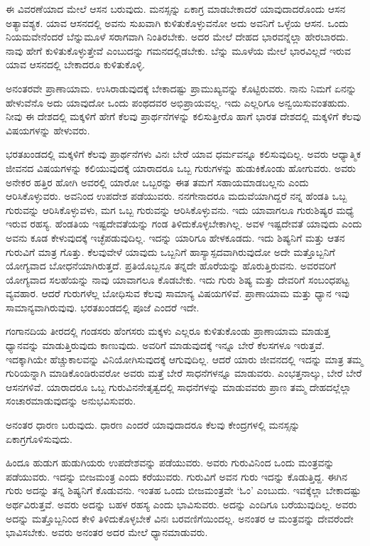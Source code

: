 ಈ ವಿವರಣೆಯಾದ ಮೇಲೆ ಆಸನ ಬರುವುದು. ಮನಸ್ಸನ್ನು ಏಕಾಗ್ರ ಮಾಡಬೇಕಾದರೆ ಯಾವುದಾದರೊಂದು ಆಸನ ಅತ್ಯಾವಶ್ಯಕ. ಯಾವ ಆಸನದಲ್ಲಿ ಅವನು ಸುಖವಾಗಿ ಕುಳಿತುಕೊಳ್ಳುವನೋ ಅದು ಅವನಿಗೆ ಒಳ್ಳೆಯ ಆಸನ. ಒಂದು ನಿಯಮವೇನೆಂದರೆ ಬೆನ್ನುಮೂಳೆ ಸರಾಗವಾಗಿ ನಿಂತಿರಬೇಕು. ಅದರ ಮೇಲೆ ದೇಹದ ಭಾರವನ್ನೆಲ್ಲಾ ಹೇರಬಾರದು. ನಾವು ಹೇಗೆ ಕುಳಿತುಕೊಳ್ಳುತ್ತೇವೆ ಎಂಬುದನ್ನು ಗಮನದಲ್ಲಿಡಬೇಕು. ಬೆನ್ನು ಮೂಳೆಯ ಮೇಲೆ ಭಾರವಿಲ್ಲದೆ ಇರುವ ಯಾವ ಆಸನದಲ್ಲಿ ಬೇಕಾದರೂ ಕುಳಿತುಕೊಳ್ಳಿ.

ಅನಂತರವೇ ಪ್ರಾಣಾಯಾಮ. ಉಸಿರಾಡುವುದಕ್ಕೆ ಬೇಕಾದಷ್ಟು ಪ್ರಾಮುಖ್ಯವನ್ನು ಕೊಟ್ಟಿರುವರು. ನಾನು ನಿಮಗೆ ಏನನ್ನು ಹೇಳುವೆನೊ ಅದು ಯಾವುದೋ ಒಂದು ಪಂಥದವರ ಅಭಿಪ್ರಾಯವಲ್ಲ. ಇದು ಎಲ್ಲರಿಗೂ ಅನ್ವಯಿಸುವಂತಹುದು. ನೀವು ಈ ದೇಶದಲ್ಲಿ ಮಕ್ಕಳಿಗೆ ಹೇಗೆ ಕೆಲವು ಪ್ರಾರ್ಥನೆಗಳನ್ನು ಕಲಿಸುತ್ತೀರೊ ಹಾಗೆ ಭಾರತ ದೇಶದಲ್ಲಿ ಮಕ್ಕಳಿಗೆ ಕೆಲವು ವಿಷಯಗಳನ್ನು ಹೇಳುವರು.

ಭರತಖಂಡದಲ್ಲಿ ಮಕ್ಕಳಿಗೆ ಕೆಲವು ಪ್ರಾರ್ಥನೆಗಳು ವಿನಃ ಬೇರೆ ಯಾವ ಧರ್ಮವನ್ನೂ ಕಲಿಸುವುದಿಲ್ಲ. ಅವರು ಆಧ್ಯಾತ್ಮಿಕ ಜೀವನದ ವಿಷಯಗಳನ್ನು ಕಲಿಯುವುದಕ್ಕೆ ಯಾರಾದರೂ ಒಬ್ಬ ಗುರುಗಳನ್ನು ಹುಡುಕಿಕೊಂಡು ಹೋಗುವರು. ಅವರು ಅನೇಕರ ಹತ್ತಿರ ಹೋಗಿ ಅವರಲ್ಲಿ ಯಾರೋ ಒಬ್ಬರನ್ನು ಈತ ತಮಗೆ ಸಹಾಯಮಾಡಬಲ್ಲನು ಎಂದು ಆರಿಸಿಕೊಳ್ಳುವರು. ಅವನಿಂದ ಉಪದೇಶ ಪಡೆಯುವರು. ನನಗೇನಾದರೂ ಮದುವೆಯಾಗಿದ್ದರೆ ನನ್ನ ಹೆಂಡತಿ ಒಬ್ಬ ಗುರುವನ್ನು ಆರಿಸಿಕೊಳ್ಳುವಳು, ಮಗ ಒಬ್ಬ ಗುರುವನ್ನು ಆರಿಸಿಕೊಳ್ಳುವನು. ಇದು ಯಾವಾಗಲೂ ಗುರುಶಿಷ್ಯರ ಮಧ್ಯೆ ಇರುವ ರಹಸ್ಯ. ಹೆಂಡತಿಯ ಇಷ್ಟದೇವತೆಯನ್ನು ಗಂಡ ತಿಳಿದುಕೊಳ್ಳಬೇಕಾಗಿಲ್ಲ. ಅವಳ ಇಷ್ಟದೇವತೆ ಯಾವುದು ಎಂದು ಅವನು ಕೂಡ ಕೇಳುವುದಕ್ಕೆ ಇಚ್ಛೆಪಡುವುದಿಲ್ಲ. ಇದನ್ನು ಯಾರಿಗೂ ಹೇಳಕೂಡದು. ಇದು ಶಿಷ್ಯನಿಗೆ ಮತ್ತು ಆತನ ಗುರುವಿಗೆ ಮಾತ್ರ ಗೊತ್ತು. ಕೆಲವುವೇಳೆ ಯಾವುದು ಒಬ್ಬನಿಗೆ ಹಾಸ್ಯಾಸ್ಪದವಾಗಿರುವುದೋ ಅದೇ ಮತ್ತೊಬ್ಬನಿಗೆ ಯೋಗ್ಯವಾದ ಬೋಧನೆಯಾಗಿರುತ್ತದೆ. ಪ್ರತಿಯೊಬ್ಬನೂ ತನ್ನದೇ ಹೊರೆಯನ್ನು ಹೊರುತ್ತಿರುವನು. ಅವರವರಿಗೆ ಯೋಗ್ಯವಾದ ಸಲಹೆಯನ್ನು ನಾವು ಯಾವಾಗಲೂ ಕೊಡಬೇಕು. ಇದು ಗುರು ಶಿಷ್ಯ ಮತ್ತು ದೇವರಿಗೆ ಸಂಬಂಧಪಟ್ಟ ವ್ಯವಹಾರ. ಆದರೆ ಗುರುಗಳೆಲ್ಲ ಬೋಧಿಸುವ ಕೆಲವು ಸಾಮಾನ್ಯ ವಿಷಯಗಳಿವೆ. ಪ್ರಾಣಾಯಾಮ ಮತ್ತು ಧ್ಯಾನ ಇವು ಸಾಮಾನ್ಯವಾಗಿರುವುವು. ಭರತಖಂಡದಲ್ಲಿ ಪೂಜೆ ಎಂದರೆ ಇದೇ.

ಗಂಗಾನದಿಯ ತೀರದಲ್ಲಿ ಗಂಡಸರು ಹೆಂಗಸರು ಮಕ್ಕಳು ಎಲ್ಲರೂ ಕುಳಿತುಕೊಂಡು ಪ್ರಾಣಾಯಾಮ ಮಾಡುತ್ತ ಧ್ಯಾನವನ್ನು ಮಾಡುತ್ತಿರುವುದು ಕಾಣುವುದು. ಅವರಿಗೆ ಮಾಡುವುದಕ್ಕೆ ಇನ್ನೂ ಬೇರೆ ಕೆಲಸಗಳೂ ಇರುತ್ತವೆ. ಇದಕ್ಕಾಗಿಯೇ ಹೆಚ್ಚುಕಾಲವನ್ನು ವಿನಿಯೋಗಿಸುವುದಕ್ಕೆ ಆಗುವುದಿಲ್ಲ. ಆದರೆ ಯಾರು ಜೀವನದಲ್ಲಿ ಇದನ್ನು ಮಾತ್ರ ತಮ್ಮ ಗುರಿಯನ್ನಾಗಿ ಮಾಡಿಕೊಂಡಿರುವರೋ ಅವರು ಮತ್ತೆ ಬೇರೆ ಸಾಧನೆಗಳನ್ನೂ ಮಾಡುವರು. ಎಂಭತ್ತನಾಲ್ಕು, ಬೇರೆ ಬೇರೆ ಆಸನಗಳಿವೆ. ಯಾರಾದರೂ ಒಬ್ಬ ಗುರುವಿನ\break ನೇತೃತ್ವದಲ್ಲಿ ಸಾಧನೆಗಳನ್ನು ಮಾಡುವವರು ಪ್ರಾಣ ತಮ್ಮ ದೇಹದಲ್ಲೆಲ್ಲಾ ಸಂಚಾರಮಾಡುವುದನ್ನು ಅನುಭವಿಸುವರು.

ಅನಂತರ ಧಾರಣ ಬರುವುದು. ಧಾರಣ ಎಂದರೆ ಯಾವುದಾದರೂ ಕೆಲವು ಕೇಂದ್ರಗಳಲ್ಲಿ ಮನಸ್ಸನ್ನು ಏಕಾಗ್ರಗೊಳಿಸುವುದು.

ಹಿಂದೂ ಹುಡುಗ ಹುಡುಗಿಯರು ಉಪದೇಶವನ್ನು ಪಡೆಯುವರು. ಅವರು ಗುರುವಿನಿಂದ ಒಂದು ಮಂತ್ರವನ್ನು ಪಡೆಯುವರು. ಇದನ್ನು ಬೀಜಮಂತ್ರ ಎಂದು ಕರೆಯುವರು. ಗುರುವಿಗೆ ಅವನ ಗುರು ಇದನ್ನು ಕೊಡುತ್ತಿದ್ದ. ಈಗಿನ ಗುರು ಅದನ್ನು ತನ್ನ ಶಿಷ್ಯನಿಗೆ ಕೊಡುವನು. ಇಂತಹ ಒಂದು ಬೀಜಮಂತ್ರವೇ `ಓಂ' ಎಂಬುದು. ಇವಕ್ಕೆಲ್ಲಾ ಬೇಕಾದಷ್ಟು ಅರ್ಥವಿರುತ್ತವೆ. ಅವರು ಅದನ್ನು ಬಹಳ ರಹಸ್ಯ ಎಂದು ಭಾವಿಸುವರು. ಅದನ್ನು ಎಂದಿಗೂ ಬರೆಯುವುದಿಲ್ಲ. ಅವರು ಅದನ್ನು ಮತ್ತೊಬ್ಬನಿಂದ ಕೇಳಿ ತಿಳಿದುಕೊಳ್ಳಬೇಕೆ ವಿನಃ ಬರವಣಿಗೆಯಿಂದಲ್ಲ. ಅನಂತರ ಆ ಮಂತ್ರವನ್ನು ದೇವರೆಂದೇ ಭಾವಿಸಬೇಕು. ಅವರು ಅನಂತರ ಅದರ ಮೇಲೆ ಧ್ಯಾನಮಾಡುವರು.

